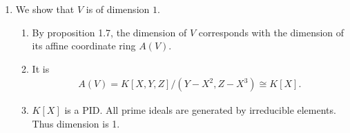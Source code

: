 \begin{solution}
\begin{enumerate}
\begin{enumerate}
        \end{enumerate}
        \item We show that \(V\) is of dimension \(1\).
        \begin{enumerate}
            \item By proposition 1.7, the dimension of \(V\) corresponds with the dimension of its affine coordinate ring \(A(V)\).
            \item It is
            \begin{align*}
                A(V) = K[X, Y, Z] / (Y-X^2, Z-X^3) \cong K[X].
            \end{align*}
            \item \(K[X]\) is a PID. All prime ideals are generated by irreducible elements. Thus dimension is 1.
        \end{enumerate}
    \end{enumerate}
\end{solution}


